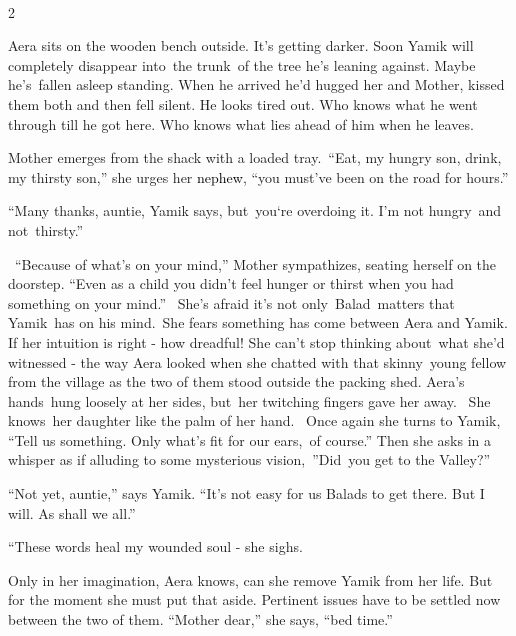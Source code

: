 \documentclass[letterpaper]{article}
\begin{document}
\textcolor[rgb]{0.13333334,0.13333334,0.13333334}{~}

\textcolor[rgb]{0.13333334,0.13333334,0.13333334}{2}

\textcolor[rgb]{0.13333334,0.13333334,0.13333334}{Aera sits on the wooden bench
out}side\textcolor[rgb]{0.13333334,0.13333334,0.13333334}{. }It's getting darker.
Soon\textcolor[rgb]{0.13333334,0.13333334,0.13333334}{ Yamik will completely disappear into~the trunk~of the tree he's
leaning against. Maybe he{}'s\ fallen asleep standing. When he }arrived he{}'d hugged her and Mother, kissed them both
and then fell silent. He looks tired out. Who knows what he went through till he got here. Who knows what lies ahead of
him when he leaves.\ 

Mother emerges from the shack with a loaded tray.\ \textcolor[rgb]{0.13333334,0.13333334,0.13333334}{{}``Eat, my hungry
son, drink, my thirsty son,'' she urges her
}\textcolor{black}{nephew}\textcolor[rgb]{0.13333334,0.13333334,0.13333334}{, ``you must've been on the road for
hours.''}

\textcolor[rgb]{0.13333334,0.13333334,0.13333334}{{}``Many thanks, auntie,{\textquotedbl} Yamik says,
{\textquotedbl}but\ you`re overdoing it. I'm not hungry\ }and
not\ \textcolor[rgb]{0.13333334,0.13333334,0.13333334}{thirsty.''}

\ {}``Because of what's on your mind,'' Mother sympathizes, seating herself on the doorstep. ``Even as a child you
didn't feel hunger or thirst when you had something on your mind.''~ She{}'s afraid it{}'s not only~Balad\ matters that
Yamik\ has on his mind.\ She fears something has come between Aera and Yamik. If her intuition is right - how dreadful!
She can{}'t stop thinking about\ what she{}'d witnessed - the way Aera looked when she chatted with that
skinny\textcolor{red}{\ }young fellow from the village as the two of them stood outside the packing shed. Aera's
hands~hung loosely at her sides, but\ her twitching fingers gave her away.~ She knows~her daughter like the palm of her
hand.~ Once again she turns to Yamik, ``Tell us something. Only what's fit for our ears,\ of course.{}'' Then she asks
in a whisper as if alluding to some mysterious vision,\ {}''Did\textcolor{red}{\ }you get to the Valley?'' 

{}``Not yet, auntie,'' says Yamik. ``It's not easy for us Balads to get there. But I will. As shall we all.'' 

{}``These words heal my wounded soul -{\textquotedbl} she sighs.

Only in her imagination, Aera knows, can she remove Yamik from her life. But for the moment she must put that aside.
Pertinent issues have to be settled now between the two of them. ``Mother dear,'' she says, ``bed time.''~ 
\end{document}
